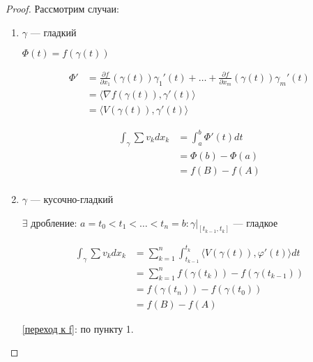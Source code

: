 \begin{proof}
	Рассмотрим случаи:
	\begin{enumerate}
		\item $\gamma$ --- гладкий

		      $\Phi(t) = f(\gamma(t))$

		      \begin{align*}
			      \Phi' & = \frac{\partial f}{\partial x_1} (\gamma(t)) \gamma_1'(t) + \ldots + \frac{\partial f}{\partial x_m} (\gamma(t)) \gamma_m'(t) \\
			            & = \langle \nabla f (\gamma(t)), \gamma'(t) \rangle                                                                             \\
			            & = \langle V (\gamma(t)), \gamma'(t) \rangle
		      \end{align*}

		      \begin{align*}
			      \int_\gamma \sum v_k dx_k & = \int_a^b \Phi'(t) dt \\
			                                & = \Phi(b) - \Phi(a)    \\
			                                & = f(B) - f(A)          \\
		      \end{align*}
		\item $\gamma$ --- кусочно-гладкий

		      $\exists$ дробление: $a = t_0 < t_1 < \ldots < t_n = b : \gamma\Big|_{[t_{k-1}, t_k]}$ --- гладкое

		      \begin{align}
			      \int_\gamma \sum v_k dx_k & = \sum_{k=1}^n \int_{t_{k-1}}^{t_k} \langle V(\gamma(t)), \varphi'(t) \rangle dt \nonumber \\
			                                & = \sum_{k=1}^n f(\gamma(t_k)) - f(\gamma(t_{k-1}))                 \label{переход к f}     \\
			                                & = f(\gamma(t_n)) - f(\gamma(t_0))                                                \nonumber \\
			                                & = f(B) - f(A) \nonumber
		      \end{align}

		      \ref{переход к f}: по пункту 1.
	\end{enumerate}
\end{proof}

